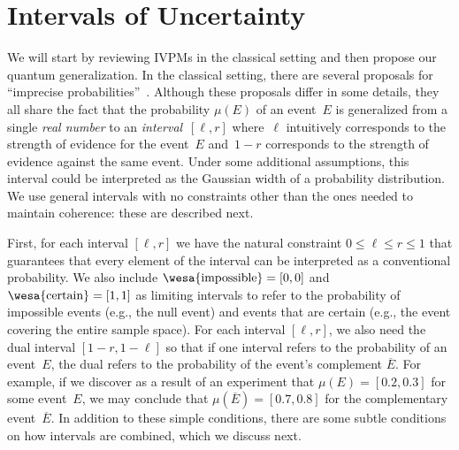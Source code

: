 \documentclass[english,reprint, aps, prl,superscriptaddress, showpacs,
showkeys, longbibliography, amsmath, amssymb, floatfix]{revtex4-1}
\theoremstyle{plain}
\theoremstyle{definition}
\newcommand{\imposs}{{\text{\wesa{impossible}}}}
\newcommand{\necess}{{\text{\wesa{certain}}}}
\begin{document}
\section{Intervals of Uncertainty}
\label{sec:Interval-Uncertainty}

We will start by reviewing IVPMs in the classical setting and then
propose our quantum generalization. In the classical setting, there
are several proposals for ``imprecise
probabilities''~\citep{Dempster1967,Shafer1976,GilboaSchmeidler1994,Marinacci1999,Weichselberger2000,JamisonLodwick2004,HuberRonchetti2009,Grabisch2016}.
Although these proposals differ in some details, they all share the
fact that the probability $\mu(E)$ of an event~$E$ is generalized from
a single \emph{real number} to an \emph{interval}~$[\ell,r]$
where~$\ell$ intuitively corresponds to the strength of evidence for
the event~$E$ and~$1-r$ corresponds to the strength of evidence
against the same event. Under some additional assumptions, this
interval could be interpreted as the Gaussian width of a probability
distribution. We use general intervals with no constraints other than
the ones needed to maintain coherence: these are described next. 

First, for each interval $[\ell,r]$ we have the natural constraint
$0 \leq \ell \leq r \leq 1$ that guarantees that every element of the
interval can be interpreted as a conventional probability. We also
include $\imposs=[0,0]$ and $\necess=[1,1]$ as limiting intervals to
refer to the probability of impossible events (e.g., the null event)
and events that are certain (e.g., the event covering the entire
sample space).  For each interval $[\ell,r]$, we also need the dual
interval $[1-r,1-\ell]$ so that if one interval refers to the
probability of an event~$E$, the dual refers to the probability of the
event's complement $\overline{E}$.  For example, if we discover as a
result of an experiment that $\mu(E) = [0.2,0.3]$ for some event~$E$,
we may conclude that $\mu(\overline{E}) = [0.7,0.8]$ for the
complementary event~$\overline{E}$. In addition to these simple
conditions, there are some subtle conditions on how intervals are
combined, which we discuss next.
\end{document}
